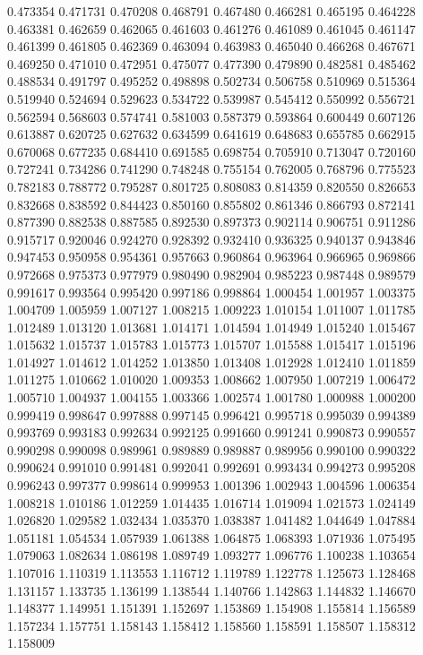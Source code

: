 0.473354
0.471731
0.470208
0.468791
0.467480
0.466281
0.465195
0.464228
0.463381
0.462659
0.462065
0.461603
0.461276
0.461089
0.461045
0.461147
0.461399
0.461805
0.462369
0.463094
0.463983
0.465040
0.466268
0.467671
0.469250
0.471010
0.472951
0.475077
0.477390
0.479890
0.482581
0.485462
0.488534
0.491797
0.495252
0.498898
0.502734
0.506758
0.510969
0.515364
0.519940
0.524694
0.529623
0.534722
0.539987
0.545412
0.550992
0.556721
0.562594
0.568603
0.574741
0.581003
0.587379
0.593864
0.600449
0.607126
0.613887
0.620725
0.627632
0.634599
0.641619
0.648683
0.655785
0.662915
0.670068
0.677235
0.684410
0.691585
0.698754
0.705910
0.713047
0.720160
0.727241
0.734286
0.741290
0.748248
0.755154
0.762005
0.768796
0.775523
0.782183
0.788772
0.795287
0.801725
0.808083
0.814359
0.820550
0.826653
0.832668
0.838592
0.844423
0.850160
0.855802
0.861346
0.866793
0.872141
0.877390
0.882538
0.887585
0.892530
0.897373
0.902114
0.906751
0.911286
0.915717
0.920046
0.924270
0.928392
0.932410
0.936325
0.940137
0.943846
0.947453
0.950958
0.954361
0.957663
0.960864
0.963964
0.966965
0.969866
0.972668
0.975373
0.977979
0.980490
0.982904
0.985223
0.987448
0.989579
0.991617
0.993564
0.995420
0.997186
0.998864
1.000454
1.001957
1.003375
1.004709
1.005959
1.007127
1.008215
1.009223
1.010154
1.011007
1.011785
1.012489
1.013120
1.013681
1.014171
1.014594
1.014949
1.015240
1.015467
1.015632
1.015737
1.015783
1.015773
1.015707
1.015588
1.015417
1.015196
1.014927
1.014612
1.014252
1.013850
1.013408
1.012928
1.012410
1.011859
1.011275
1.010662
1.010020
1.009353
1.008662
1.007950
1.007219
1.006472
1.005710
1.004937
1.004155
1.003366
1.002574
1.001780
1.000988
1.000200
0.999419
0.998647
0.997888
0.997145
0.996421
0.995718
0.995039
0.994389
0.993769
0.993183
0.992634
0.992125
0.991660
0.991241
0.990873
0.990557
0.990298
0.990098
0.989961
0.989889
0.989887
0.989956
0.990100
0.990322
0.990624
0.991010
0.991481
0.992041
0.992691
0.993434
0.994273
0.995208
0.996243
0.997377
0.998614
0.999953
1.001396
1.002943
1.004596
1.006354
1.008218
1.010186
1.012259
1.014435
1.016714
1.019094
1.021573
1.024149
1.026820
1.029582
1.032434
1.035370
1.038387
1.041482
1.044649
1.047884
1.051181
1.054534
1.057939
1.061388
1.064875
1.068393
1.071936
1.075495
1.079063
1.082634
1.086198
1.089749
1.093277
1.096776
1.100238
1.103654
1.107016
1.110319
1.113553
1.116712
1.119789
1.122778
1.125673
1.128468
1.131157
1.133735
1.136199
1.138544
1.140766
1.142863
1.144832
1.146670
1.148377
1.149951
1.151391
1.152697
1.153869
1.154908
1.155814
1.156589
1.157234
1.157751
1.158143
1.158412
1.158560
1.158591
1.158507
1.158312
1.158009
